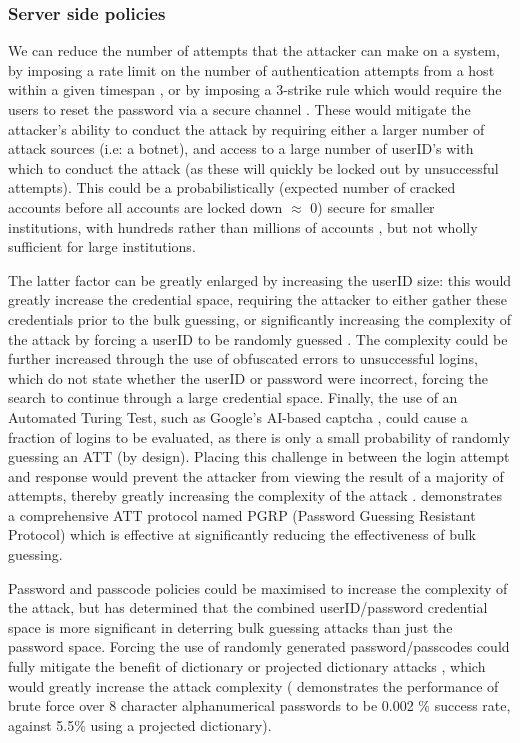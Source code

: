 \documentclass[british,11pt,a4paper]{article}
\begin{document}
\subsubsection{Server side policies}
We can reduce the number of attempts that the attacker can make on a system, by imposing a rate limit on the number of authentication attempts from a host within a given timespan \cite{Florencio2007-yp}, or by imposing a 3-strike rule which would require the users to reset the password via a secure channel \cite{Florencio2007-yp}. These would mitigate the attacker's ability to conduct the attack by requiring either a larger number of attack sources (i.e: a botnet), and access to a large number of userID's with which to conduct the attack (as these will quickly be locked out by unsuccessful attempts). This could be a probabilistically (expected number of cracked accounts before all accounts are locked down $\approx$ 0) secure for smaller institutions, with hundreds rather than millions of accounts \cite{Florencio2007-yp}, but not wholly sufficient for large institutions. 

The latter factor can be greatly enlarged by increasing the userID size: this would greatly increase the credential space, requiring the attacker to either gather these credentials prior to the bulk guessing, or significantly increasing the complexity of the attack by forcing a userID to be randomly guessed \cite{Kosamkar_undated-ik}. The complexity could be further increased through the use of obfuscated errors to unsuccessful logins, which do not state whether the userID or password were incorrect, forcing the search to continue through a large credential space. Finally, the use of an Automated Turing Test, such as Google's AI-based captcha \cite{noauthor_undated-lk}, could cause a fraction of logins to be evaluated, as there is only a small probability of randomly guessing an ATT (by design). Placing this challenge in between the login attempt and response would prevent the attacker from viewing the result of a majority of attempts, thereby greatly increasing the complexity of the attack \cite{Alsaleh2012-ek}. \citet{Alsaleh2012-ek} demonstrates a comprehensive ATT protocol named PGRP (Password Guessing Resistant Protocol) which is effective at significantly reducing the effectiveness of bulk guessing.

Password and passcode policies could be maximised to increase the complexity of the attack, but \citet{Florencio2007-yp} has determined that the combined userID/password credential space is more significant in deterring bulk guessing attacks than just the password space. Forcing the use of randomly generated password/passcodes could fully mitigate the benefit of dictionary or projected dictionary attacks \cite{Kosamkar_undated-ik}, which would greatly increase the attack complexity (\citet{Aspinall2013-sh} demonstrates the performance of brute force over 8 character alphanumerical passwords to be 0.002 \% success rate, against 5.5\% using a projected dictionary).
\end{document}
